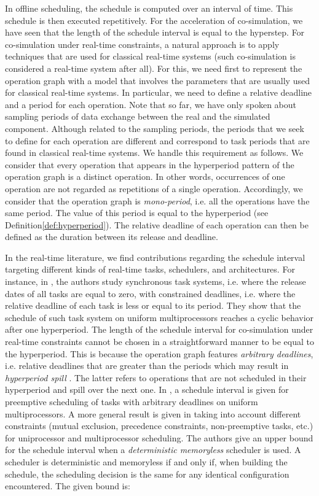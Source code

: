 In offline scheduling, the schedule is computed over an interval of time. This schedule is then executed repetitively. For the acceleration of co-simulation, we have seen that the length of the schedule interval is equal to the hyperstep. For co-simulation under real-time constraints, a natural approach is to apply techniques that are used for classical real-time systems (such co-simulation is considered a real-time system after all). For this, we need first to represent the operation graph with a model that involves the parameters that are usually used for classical real-time systems. In particular, we need to define a relative deadline and a period for each operation. Note that so far, we have only spoken about sampling periods of data exchange between the real and the simulated component. Although related to the sampling periods, the periods that we seek to define for each operation are different and correspond to task periods that are found in classical real-time systems. We handle this requirement as follows. We consider that every operation that appears in the hyperperiod pattern of the operation graph is a distinct operation. In other words, occurrences of one operation are not regarded as repetitions of a single operation. Accordingly, we consider that the operation graph is \textit{mono-period}, i.e. all the operations have the same period. The value of this period is equal to the hyperperiod (see Definition\ref{def:hyperperiod}). The relative deadline of each operation can then be defined as the duration between its release and deadline.   

In the real-time literature, we find contributions regarding the schedule interval targeting different kinds of real-time tasks, schedulers, and architectures. For instance, in \cite{cucu:2006}, the authors study synchronous task systems, i.e. where the release dates of all tasks are equal to zero, with constrained deadlines, i.e. where the relative deadline of each task is less or equal to its period. They show that the schedule of such task system on uniform multiprocessors reaches a cyclic behavior after one hyperperiod. The length of the schedule interval for co-simulation under real-time constraints cannot be chosen in a straightforward manner to be equal to the hyperperiod. This is because the operation graph features \textit{arbitrary deadlines}, i.e. relative deadlines that are greater than the periods which may result in \textit{hyperperiod spill} \cite{dave:1999}. The latter refers to operations that are not scheduled in their hyperperiod and spill over the next one. In \cite{cucu:2007}, a schedule interval is given for preemptive scheduling of tasks with arbitrary deadlines on uniform multiprocessors. A more general result is given in \cite{grolleau:2013} taking into account different constraints (mutual exclusion, precedence constraints, non-preemptive tasks, etc.) for uniprocessor and multiprocessor scheduling. The authors give an upper bound for the schedule interval when a \textit{deterministic memoryless} scheduler is used. A scheduler is deterministic and memoryless if and only if, when building the schedule, the scheduling decision is the same for any identical configuration encountered. The given bound is:

